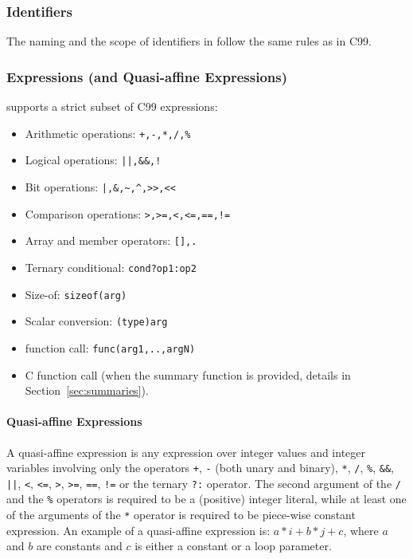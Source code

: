 \subsubsection{Identifiers}
The naming and the scope of identifiers in \pencil follow the same rules as
in C99.

\subsubsection{Expressions (and Quasi-affine Expressions)}
\pencil supports a strict subset of C99 expressions:
\begin{itemize}
  \item Arithmetic operations: \lstinline!+,-,*,/,%!
  \item Logical operations: \lstinline{||,&&,!}
  \item Bit operations: \lstinline{|,&,~,^,>>,<<}
  \item Comparison operations: \lstinline{>,>=,<,<=,==,!=}
  \item Array and member operators: \lstinline{[],.}
  \item Ternary conditional: \lstinline!cond?op1:op2!
  \item Size-of: \lstinline!sizeof(arg)!
  \item Scalar conversion: \lstinline!(type)arg!
  \item \pencil function call: \lstinline!func(arg1,..,argN)!
  \item C function call (when the summary function is provided,
  details in Section~\ref{sec:summaries}).
\end{itemize}


\paragraph{Quasi-affine Expressions}
\label{sec:quasi-affine}

A quasi-affine expression is any expression over integer values and
integer variables involving only the operators \lstinline{+},
\lstinline{-} (both unary and binary), \lstinline{*}, \lstinline{/},
\lstinline{%}, \lstinline{&&}, \lstinline{||}, \lstinline{<}, \lstinline{<=},
\lstinline{>}, \lstinline{>=}, \lstinline{==}, \lstinline{!=} or the
ternary \lstinline{?:} operator.  The second argument of the
\lstinline{/} and the \lstinline{%}
operators is required to be a (positive) integer literal, while at
least one of the arguments of the \lstinline{*} operator is
required to be piece-wise constant expression. An example of a
quasi-affine expression is: $a*i+b*j+c$, where $a$ and $b$ are
constants and $c$ is either a constant or a loop parameter.

